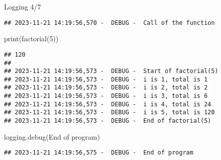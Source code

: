 \documentclass[
  8pt,
  ignorenonframetext,
]{beamer}
\newenvironment{Shaded}{\begin{snugshade}}{\end{snugshade}}
\newcommand{\BuiltInTok}[1]{#1}
\newcommand{\DecValTok}[1]{\textcolor[rgb]{0.00,0.00,0.81}{#1}}
\newcommand{\NormalTok}[1]{#1}
\newcommand{\StringTok}[1]{\textcolor[rgb]{0.31,0.60,0.02}{#1}}
\begin{document}
\begin{frame}[fragile]{Logging 4/7}
\begin{verbatim}
## 2023-11-21 14:19:56,570 -  DEBUG -  Call of the function
\end{verbatim}

\begin{Shaded}
\begin{Highlighting}[]
\BuiltInTok{print}\NormalTok{(factorial(}\DecValTok{5}\NormalTok{))}
\end{Highlighting}
\end{Shaded}

\begin{verbatim}
## 120
## 
## 2023-11-21 14:19:56,573 -  DEBUG -  Start of factorial(5)
## 2023-11-21 14:19:56,573 -  DEBUG -  i is 1, total is 1
## 2023-11-21 14:19:56,573 -  DEBUG -  i is 2, total is 2
## 2023-11-21 14:19:56,573 -  DEBUG -  i is 3, total is 6
## 2023-11-21 14:19:56,573 -  DEBUG -  i is 4, total is 24
## 2023-11-21 14:19:56,573 -  DEBUG -  i is 5, total is 120
## 2023-11-21 14:19:56,573 -  DEBUG -  End of factorial(5)
\end{verbatim}

\begin{Shaded}
\begin{Highlighting}[]
\NormalTok{logging.debug(}\StringTok{\textquotesingle{}End of program\textquotesingle{}}\NormalTok{)}
\end{Highlighting}
\end{Shaded}

\begin{verbatim}
## 2023-11-21 14:19:56,575 -  DEBUG -  End of program
\end{verbatim}
\end{frame}
\end{document}
